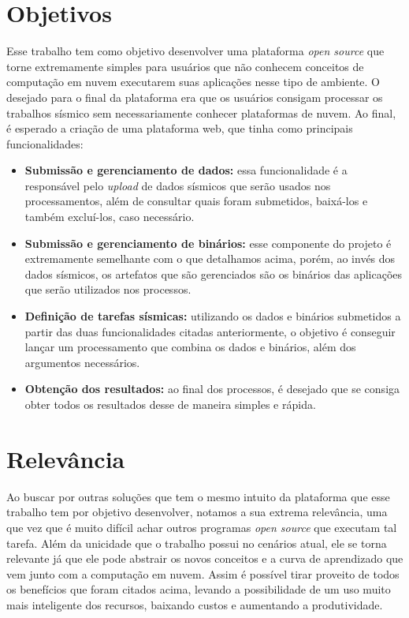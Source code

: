 \documentclass[11pt,twoside]{article}
\begin{document}
\section{Objetivos}
Esse trabalho tem como objetivo desenvolver uma plataforma \emph{open source} que torne extremamente simples para usuários que não conhecem conceitos de computação em nuvem 
executarem suas aplicações nesse tipo de ambiente. 
O desejado para o final da plataforma era que os usuários consigam processar 
os trabalhos sísmico sem necessariamente conhecer plataformas de nuvem.  
Ao final, é esperado a criação de uma plataforma web, que tinha como principais funcionalidades:

\begin{itemize}
  \item \textbf{Submissão e gerenciamento de dados:} essa funcionalidade é a responsável pelo \emph{upload} de dados sísmicos que serão usados nos processamentos, além de consultar quais foram submetidos, baixá-los e também
  excluí-los, caso necessário. 
  \item \textbf{Submissão e gerenciamento de binários:} esse componente do projeto é extremamente semelhante com o que detalhamos acima, porém, ao invés dos dados sísmicos, os artefatos que são gerenciados são os 
  binários das aplicações que serão utilizados nos processos.
  \item \textbf{Definição de tarefas sísmicas:} utilizando os dados e binários submetidos a partir das duas funcionalidades citadas anteriormente, o objetivo é conseguir lançar um processamento que combina os dados e 
  binários, além dos argumentos necessários.
  \item \textbf{Obtenção dos resultados:} ao final dos processos, é desejado que se consiga obter todos os resultados desse de maneira simples e rápida.
\end{itemize}

\section{Relevância}
Ao buscar por outras soluções que tem o mesmo intuito da plataforma que esse trabalho tem por objetivo desenvolver, notamos a sua extrema relevância, uma que vez que é muito difícil achar outros programas \emph{open source} que executam tal tarefa.
Além da unicidade que o trabalho possui no cenários atual, ele se torna relevante já que ele pode abstrair os novos conceitos e a curva de aprendizado que vem junto com a computação em nuvem. Assim é possível
tirar proveito de todos os benefícios que foram citados acima, levando a possibilidade de um uso muito mais inteligente dos recursos, baixando custos e aumentando a produtividade.
\end{document}
